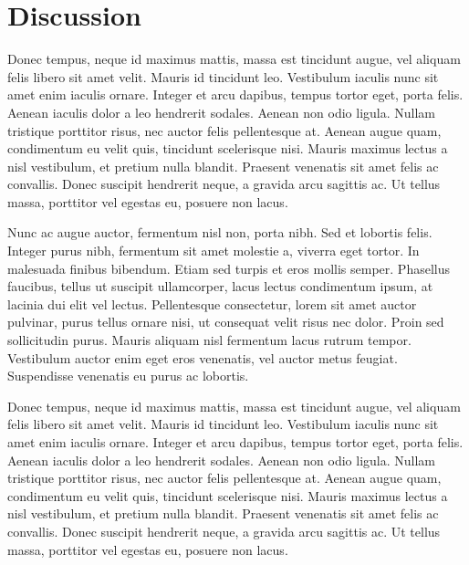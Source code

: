 \documentclass[twocolumn,superscriptaddress,aps]{revtex4-1}
\begin{document}
\section{Discussion}

Donec tempus, neque id maximus mattis, massa est tincidunt augue, vel aliquam felis libero sit amet velit. Mauris id tincidunt leo. Vestibulum iaculis nunc sit amet enim iaculis ornare. Integer et arcu dapibus, tempus tortor eget, porta felis. Aenean iaculis dolor a leo hendrerit sodales. Aenean non odio ligula. Nullam tristique porttitor risus, nec auctor felis pellentesque at. Aenean augue quam, condimentum eu velit quis, tincidunt scelerisque nisi. Mauris maximus lectus a nisl vestibulum, et pretium nulla blandit. Praesent venenatis sit amet felis ac convallis. Donec suscipit hendrerit neque, a gravida arcu sagittis ac. Ut tellus massa, porttitor vel egestas eu, posuere non lacus.

Nunc ac augue auctor, fermentum nisl non, porta nibh. Sed et lobortis felis. Integer purus nibh, fermentum sit amet molestie a, viverra eget tortor. In malesuada finibus bibendum. Etiam sed turpis et eros mollis semper. Phasellus faucibus, tellus ut suscipit ullamcorper, lacus lectus condimentum ipsum, at lacinia dui elit vel lectus. Pellentesque consectetur, lorem sit amet auctor pulvinar, purus tellus ornare nisi, ut consequat velit risus nec dolor. Proin sed sollicitudin purus. Mauris aliquam nisl fermentum lacus rutrum tempor. Vestibulum auctor enim eget eros venenatis, vel auctor metus feugiat. Suspendisse venenatis eu purus ac lobortis.

Donec tempus, neque id maximus mattis, massa est tincidunt augue, vel aliquam felis libero sit amet velit. Mauris id tincidunt leo. Vestibulum iaculis nunc sit amet enim iaculis ornare. Integer et arcu dapibus, tempus tortor eget, porta felis. Aenean iaculis dolor a leo hendrerit sodales. Aenean non odio ligula. Nullam tristique porttitor risus, nec auctor felis pellentesque at. Aenean augue quam, condimentum eu velit quis, tincidunt scelerisque nisi. Mauris maximus lectus a nisl vestibulum, et pretium nulla blandit. Praesent venenatis sit amet felis ac convallis. Donec suscipit hendrerit neque, a gravida arcu sagittis ac. Ut tellus massa, porttitor vel egestas eu, posuere non lacus.





\end{document}
